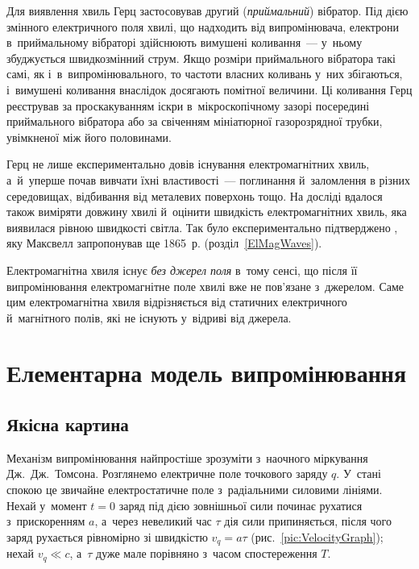 Для виявлення хвиль Герц застосовував другий (\emph{приймальний}) вібратор. Під дією
змінного електричного поля хвилі, що надходить від випромінювача, електрони в~приймальному
вібраторі здійснюють вимушені коливання~--- у~ньому збуджується швидкозмінний струм. Якщо
розміри приймального вібратора такі самі, як і~в~випромінювального, то частоти власних
коливань у~них збігаються, і~вимушені коливання внаслідок  досягають
помітної величини. Ці коливання Герц реєстрував за проскакуванням іскри в~мікроскопічному
зазорі посередині приймального вібратора або за свіченням мініатюрної газорозрядної трубки,
увімкненої між його половинами.

Герц не лише експериментально довів існування електромагнітних хвиль, а~й~уперше почав
вивчати їхні властивості~--- поглинання й~заломлення в різних середовищах, відбивання від
металевих поверхонь тощо. На досліді вдалося також виміряти довжину хвилі й~оцінити
швидкість електромагнітних хвиль, яка виявилася рівною швидкості світла. Так було експериментально підтверджено
, яку Максвелл запропонував ще 1865~р. (розділ~\ref{ElMagWaves}).

Електромагнітна хвиля існує \emph{без джерел поля} в~тому сенсі, що після її
випромінювання електромагнітне поле хвилі вже не пов'язане з~джерелом. Саме цим
електромагнітна хвиля відрізняється від статичних електричного й~магнітного полів, які
не існують у~відриві від джерела.



\section{Елементарна модель випромінювання}\hypertarget{elementary-radiation-model}{}


\subsection*{Якісна картина}


Механізм випромінювання найпростіше зрозуміти з~наочного міркування Дж.~Дж.~Томсона.
Розглянемо електричне поле точкового заряду $q$. У~стані спокою це звичайне
електростатичне поле з~радіальними силовими лініями. Нехай у~момент $t=0$ заряд під дією
зовнішньої сили починає рухатися з~прискоренням $a$, а~через невеликий час $\tau$ дія сили
припиняється, після чого заряд рухається рівномірно зі швидкістю $v_q=a\tau$
(рис.~\ref{pic:VelocityGraph}); нехай $v_q\ll c$, а~$\tau$ дуже мале порівняно з~часом
спостереження $T$.


